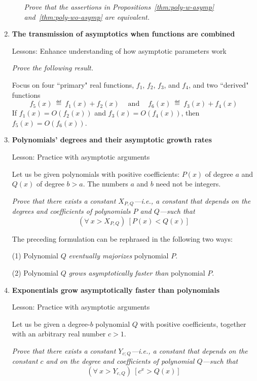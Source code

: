 \begin{enumerate}
\begin{enumerate}
{\em Prove that the assertions in Propositions~\ref{thm:poly-w-asymp} and~\ref{thm:poly-wo-asymp} are equivalent.}
  \end{enumerate}

\medskip\item
{\bf The transmission of asymptotics when functions are combined}

{\sc Lessons:} Enhance understanding of how asymptotic parameters work

\smallskip

{\em Prove the following result.}

\begin{prop}
Focus on four ``primary" real functions, $f_1$, $f_2$, $f_3$, and $f_4$, and two ``derived" functions
\[ f_5(x) \ \eqdef \ f_1(x) + f_2(x) \ \ \ \ \mbox{ and } \ \ \ \ f_6(x) \ \eqdef \ f_3(x) + f_4(x) \]  
If $f_1(x) = O(f_2(x))$ and $f_3(x) = O(f_4(x))$, then $f_5(x) = O(f_6(x))$.
\end{prop}

\medskip\item
{\bf Polynomials' degrees and their asymptotic growth rates}

{\sc Lesson:} Practice with asymptotic arguments

\smallskip

Let us be given polynomials with positive coefficients: $P(x)$ of degree $a$ and $Q(x)$ of degree $b > a$.  The numbers $a$ and $b$ need not be integers. 

\smallskip

{\em Prove that there exists a constant $X_{P,Q}$---i.e., a constant that depends on the degrees and coefficients of polynomials $P$ and $Q$---such that}
\[ (\forall \ x > X_{P,Q}) \ \left[ P(x) < Q(x) \right] \]

\smallskip

The preceding formulation can be rephrased in the following two ways:

(1) Polynomial $Q$ {\em eventually majorizes} polynomial $P$.

(2) Polynomial $Q$ {\em grows asymptotically faster than} polynomial $P$.

\medskip\item
{\bf Exponentials grow asymptotically faster than polynomials}

{\sc Lesson:} Practice with asymptotic arguments

\smallskip

Let us be given a degree-$b$ polynomial $Q$ with positive coefficients, together with an arbitrary real number $c > 1$.

\smallskip

{\em Prove that there exists a constant $Y_{c;Q}$---i.e., a constant that depends on the constant $c$ and on the degree and coefficients of polynomial $Q$---such that}
\[ (\forall \ x > Y_{c,Q}) \ \left[ c^x > Q(x) \right] \]
\end{enumerate}

